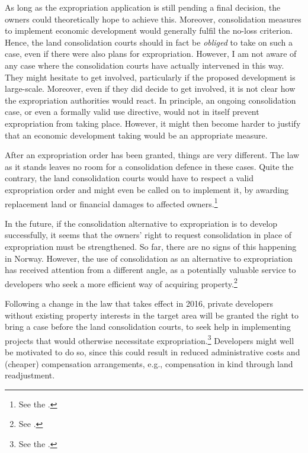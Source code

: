 As long as the expropriation application is still pending a final decision, the owners could theoretically hope to achieve this. Moreover, consolidation measures to implement economic development would generally fulfil the no-loss criterion. Hence, the land consolidation courts should in fact be {\it obliged} to take on such a case, even if there were also plans for expropriation. However, I am not aware of any case where the consolidation courts have actually intervened in this way. They might hesitate to get involved, particularly if the proposed development is large-scale. Moreover, even if they did decide to get involved, it is not clear how the expropriation authorities would react. In principle, an ongoing consolidation case, or even a formally valid use directive, would not in itself prevent expropriation from taking place. However, it might then become harder to justify that an economic development taking would be an appropriate measure.

After an expropriation order has been granted, things are very different. The law as it stands leaves no room for a consolidation defence in these cases. Quite the contrary, the land consolidation courts would have to respect a valid expropriation order and might even be called on to implement it, by awarding replacement land or financial damages to affected owners.\footnote{See the \dni\cite[6]{lca79}.}

In the future, if the consolidation alternative to expropriation is to develop successfully, it seems that the owners' right to request consolidation in place of expropriation must be strengthened. So far, there are no signs of this happening in Norway. However, the use of consolidation as an alternative to expropriation has received attention from a different angle, as a potentially valuable service to developers who seek a more efficient way of acquiring property.\footnote{See \cite[84]{prop12}.}

Following a change in the law that takes effect in 2016, private developers without existing property interests in the target area will be granted the right to bring a case before the land consolidation courts, to seek help in implementing projects that would otherwise necessitate expropriation.\footnote{See the \dni\cite[1-5(3)]{lca13}.} Developers might well be motivated to do so, since this could result in reduced administrative costs and (cheaper) compensation arrangements, e.g., compensation in kind through land readjustment.

